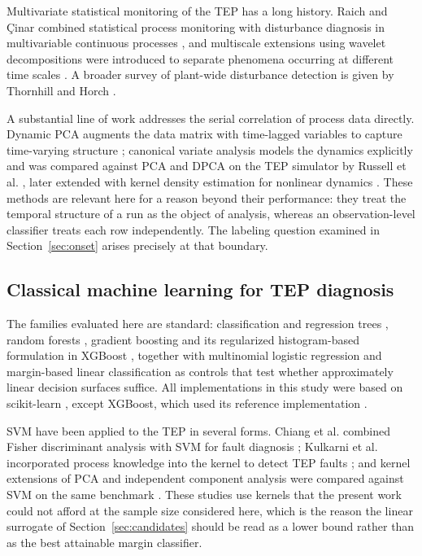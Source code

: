 \documentclass[10pt,twocolumn,a4paper]{article}
\begin{document}
Multivariate statistical monitoring of the TEP has a long history. Raich and
\c{C}inar combined statistical process monitoring with disturbance diagnosis in
multivariable continuous processes \cite{raich1996spm}, and multiscale
extensions using wavelet decompositions were introduced to separate phenomena
occurring at different time scales \cite{misra2002multiscale}. A broader survey
of plant-wide disturbance detection is given by Thornhill and Horch
\cite{thornhill2007plantwide}.

A substantial line of work addresses the serial correlation of process data
directly. Dynamic PCA augments the data matrix with time-lagged variables to
capture time-varying structure \cite{ku1995dpca}; canonical variate analysis
models the dynamics explicitly and was compared against PCA and DPCA on the TEP
simulator by Russell et al. \cite{russell2000cva}, later extended with kernel
density estimation for nonlinear dynamics \cite{odiowei2010cva}. These methods
are relevant here for a reason beyond their performance: they treat the
temporal structure of a run as the object of analysis, whereas an
observation-level classifier treats each row independently. The labeling
question examined in Section~\ref{sec:onset} arises precisely at that
boundary.

\subsection{Classical machine learning for TEP diagnosis}

The families evaluated here are standard: classification and regression trees
\cite{breiman1984cart}, random forests \cite{breiman2001rf}, gradient boosting
\cite{friedman2001gbm} and its regularized histogram-based formulation in
XGBoost \cite{chen2016xgboost}, together with multinomial logistic regression
and margin-based linear classification \cite{cortes1995svm} as controls that
test whether approximately linear decision surfaces suffice. All
implementations in this study were based on scikit-learn
\cite{pedregosa2011sklearn}, except XGBoost,
which used its reference implementation \cite{chen2016xgboost}.

SVM have been applied to the TEP in several forms. Chiang
et al. combined Fisher discriminant analysis with SVM for
fault diagnosis \cite{chiang2003fdasvm}; Kulkarni et al. incorporated process
knowledge into the kernel to detect TEP faults \cite{kulkarni2005knowledge};
and kernel extensions of PCA and independent component analysis were compared
against SVM on the same benchmark \cite{zhang2009kpca}. These studies use
kernels that the present work could not afford at the sample size considered
here, which is the reason the linear surrogate of Section~\ref{sec:candidates}
should be read as a lower bound rather than as the best attainable margin
classifier.
\end{document}
